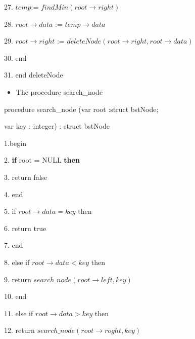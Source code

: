 \documentclass{article}
\begin{document}
27.\hspace{50pt} $temp $:= $findMin (root\rightarrow right)$

28.\hspace{50pt} $root\rightarrow data$ := $temp\rightarrow data$

29.\hspace{50pt} $root\rightarrow right$ := $deleteNode(root\rightarrow right, root\rightarrow data)$

30.\hspace{40pt} end

31.\hspace{30pt} end deleteNode

\begin{itemize}
    \item The procedure search\_node
\end{itemize}

procedure search\_node (var root :struct bstNode; 

\indent  \indent   \indent    \indent  \indent   \indent  \indent
  var key : integer) : struct bstNode
  
  
1.\indent  begin

2.\hspace{40pt} {\bf if} root = NULL {\bf then}

3.\hspace{50pt} return false

4.\hspace{40pt} end

5.\hspace{40pt} if $root\rightarrow data = key$ \hspace{5pt} then

6.\hspace{50pt} return true

7.\hspace{40pt} end

8.\hspace{40pt} else if $root\rightarrow data < key$ \hspace{5pt} then

9.\hspace{50pt} return $search\_node(root\rightarrow left, key)$

10.\hspace{40pt} end

11.\hspace{40pt} else if $root\rightarrow data > key$ \hspace{5pt} then

12.\hspace{50pt} return $search\_node(root\rightarrow roght, key)$
\end{document}
